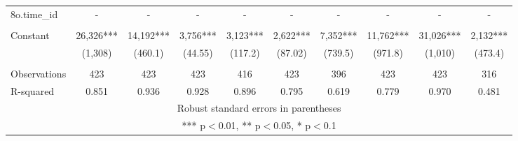 \documentclass[]{article}
\begin{document}
\begin{tabular}{lccccccccc}
8o.time\_id & - & - & - & - & - & - & - & - & - \\
 &  &  &  &  &  &  &  &  &  \\
Constant & 26,326*** & 14,192*** & 3,756*** & 3,123*** & 2,622*** & 7,352*** & 11,762*** & 31,026*** & 2,132*** \\
 & (1,308) & (460.1) & (44.55) & (117.2) & (87.02) & (739.5) & (971.8) & (1,010) & (473.4) \\
 &  &  &  &  &  &  &  &  &  \\
Observations & 423 & 423 & 423 & 416 & 423 & 396 & 423 & 423 & 316 \\
 R-squared & 0.851 & 0.936 & 0.928 & 0.896 & 0.795 & 0.619 & 0.779 & 0.970 & 0.481 \\ \hline
\multicolumn{10}{c}{ Robust standard errors in parentheses} \\
\multicolumn{10}{c}{ *** p$<$0.01, ** p$<$0.05, * p$<$0.1} \\
\end{tabular}
\end{document}
